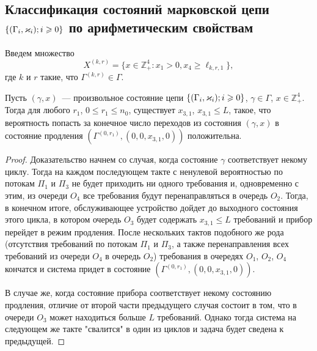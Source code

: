\documentclass[a4paper,12pt,russian]{extarticle}
\newcommand{\G}{\Gamma}
\newcommand{\Mark}{\{(\G_i, \vk_i); i \geqslant 0\}}
\newcommand{\ga}[1]{\Gamma^{\left( #1 \right)} }
\begin{document}
\subsection{Классификация состояний марковской цепи $\Mark$ по арифметическим свойствам}
Введем множество 
\begin{equation*}
X^{(k,r)} = \{x \in \mathbb{Z}_+^4 \colon x_1 > 0, x_4 \geqslant \ell_{k,r,1}\},
\end{equation*}
где $k$ и $r$ такие, что $\ga{k,r}\in \G$. 

\begin{lemma}
Пусть $(\gamma,x)$~--- произвольное состояние цепи $\Mark$, $\gamma\in \G$, $x \in \mathbb{Z}_+^4$. Тогда для любого $r_1$, $0\leqslant r_1 \leqslant n_0$, существует $x_{3,1}$, $x_{3,1} \leqslant L$, такое, что вероятность попасть за конечное число переходов из состояния $(\gamma,x)$ в состояние продления $(\ga{0,r_1}, (0,0,x_{3,1},0))$ положительна.
\label{lemma:1}
\end{lemma}
\begin{proof}
Доказательство начнем со случая, когда состояние $\gamma$ соответствует некому циклу. Тогда на каждом последующем такте с ненулевой вероятностью по потокам $\Pi_1$ и $\Pi_3$ не будет приходить ни одного требования и, одновременно с этим, из очереди $O_4$ все требования будут перенаправляться в очередь $O_2$. Тогда, в конечном итоге, обслуживающее устройство дойдет до выходного состояния этого цикла, в котором очередь $O_3$ будет содержать $x_{3,1} \leqslant L$ требований и прибор перейдет в режим продления. После нескольких тактов подобного же рода (отсутствия требований по потокам $\Pi_1$ и $\Pi_3$, а также перенаправления всех требований из очереди $O_4$ в очередь $O_2$) требования в очередях $O_1$, $O_2$, $O_4$ кончатся и система придет в состояние $(\ga{0,r_1}, (0,0,x_{3,1},0))$.

В случае же, когда состояние прибора соответствует некому состоянию продления, отличие от второй части предыдущего случая состоит в том, что в очереди $O_3$ может находиться больше $L$ требований. Однако тогда система на следующем же такте "свалится" в один из циклов и задача будет сведена к предыдущей. 
\end{proof}
\end{document}
